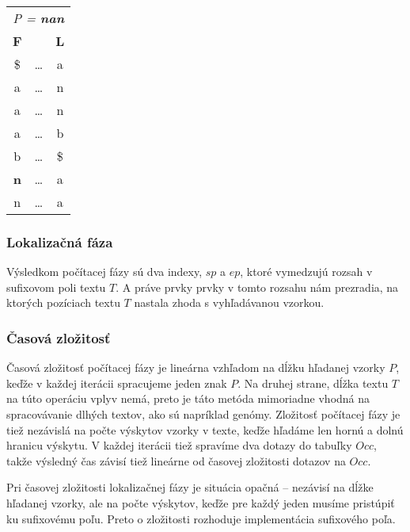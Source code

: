 \begin{example}
\begin{minipage}{2in}
\begin{tabular}{ c c c }
                \multicolumn{3}{c}{\emph{P = \textbf{nan}}} \\
                \textbf{F} &        & \textbf{L} \\
                \$         & \ldots & a          \\            
                a          & \ldots & n          \\
                a          & \ldots & n          \\
                a          & \ldots & b          \\
                b          & \ldots & \$         \\
                \textbf{n} & \ldots & a          \\ 
                n          & \ldots & a          \\
            \end{tabular}
        \end{minipage}
    \end{example}
    \bigskip

    \subsubsection{Lokalizačná fáza}
    Výsledkom počítacej fázy sú dva indexy, $sp$ a $ep$, ktoré vymedzujú rozsah v sufixovom poli textu $T$. A práve prvky prvky v tomto rozsahu nám prezradia, na ktorých pozíciach textu $T$ nastala zhoda s vyhľadávanou vzorkou.
    
    \subsubsection{Časová zložitosť}
    Časová zložitosť počítacej fázy je lineárna vzhľadom na dĺžku hľadanej vzorky $P$, keďže v každej iterácii spracujeme jeden znak $P$. Na druhej strane, dĺžka textu $T$ na túto operáciu vplyv nemá, preto je táto metóda mimoriadne vhodná na spracovávanie dlhých textov, ako sú napríklad genómy. Zložitosť počítacej fázy je tiež nezávislá na počte výskytov vzorky v texte, keďže hľadáme len hornú a dolnú hranicu výskytu. V každej iterácii tiež spravíme dva dotazy do tabuľky $Occ$, takže výsledný čas závisí tiež lineárne od časovej zložitosti dotazov na $Occ$.
    
    Pri časovej zložitosti lokalizačnej fázy je situácia opačná -- nezávisí na dĺžke hľadanej vzorky, ale na počte výskytov, keďže pre každý jeden musíme pristúpiť ku sufixovému poľu. Preto o zložitosti rozhoduje implementácia sufixového poľa.
    
